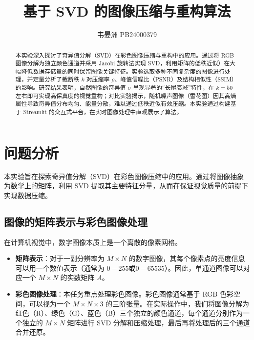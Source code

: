 
\title{\bfseries 基于 SVD 的图像压缩与重构算法}
\author{韦晏洲 \quad PB24000379}


	\maketitle
	\begin{abstract}
		本实验深入探讨了奇异值分解（SVD）在彩色图像压缩与重构中的应用。通过将 RGB 图像分解为独立颜色通道并采用 Jacobi 旋转法实现 SVD，利用矩阵的低秩近似）在大幅降低数据存储量的同时保留图像关键特征。实验选取多种不同复杂度的图像进行处理，并定量分析了截断秩 $k$ 对压缩率 $\rho$、峰值信噪比（PSNR）及结构相似性（SSIM）的影响。研究结果表明，自然图像的奇异值 $\sigma$ 呈现显著的“长尾衰减”特性，在 $k=50$ 左右即可实现高保真度的视觉重构；对比实验揭示，随机噪声图像（雪花图）因其高熵属性导致奇异值分布均匀、能量分散，难以通过低秩近似有效压缩。本实验通过构建基于 Streamlit 的交互式平台，在实时图像处理中直观展示了算法。
	\end{abstract}
	\clearpage

	\section{问题分析}
	
	本实验旨在探索奇异值分解（SVD）在彩色图像压缩中的应用。通过将图像抽象为数学上的矩阵，利用 SVD 提取其主要特征分量，从而在保证视觉质量的前提下实现数据压缩。
	
	\subsection{图像的矩阵表示与彩色图像处理}
	在计算机视觉中，数字图像本质上是一个离散的像素网格。
	\begin{itemize}
		\item \textbf{矩阵表示}：对于一副分辨率为 $M \times N$ 的数字图像，其每个像素点的亮度信息可以用一个数值表示（通常为 $0-255$或$0-65535$）。因此，单通道图像可以对应一个 $M \times N$ 的实数矩阵 $A$。
		
		\item \textbf{彩色图像处理}：本任务重点处理彩色图像。彩色图像通常基于 RGB 色彩空间，可以视为一个 $M \times N \times 3$ 的三阶张量。在实际操作中，我们将图像分解为红色（R）、绿色（G）、蓝色（B）三个独立的颜色通道，每个通道分别作为一个独立的 $M \times N$ 矩阵进行 SVD 分解和压缩处理，最后再将处理后的三个通道合并还原。
	\end{itemize}
	
